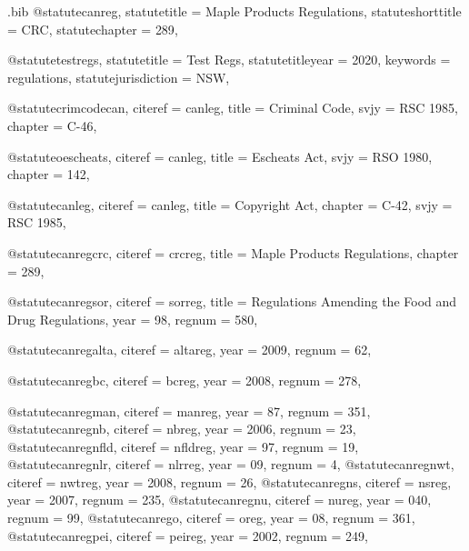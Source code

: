 \begin{filecontents*}{\jobname.bib}
@statute{canreg,
statutetitle = {Maple Products Regulations},
statuteshorttitle = {CRC},
statutechapter = {289},
}

@statute{testregs,
statutetitle = {Test Regs},
statutetitleyear = {2020},%
keywords = {regulations},
statutejurisdiction = {NSW},
}




@statute{crimcodecan,
citeref = {canleg},
title = {Criminal Code},
svjy = {RSC 1985},
chapter = {C-46},
}


@statute{oescheats,
citeref = {canleg},
title = {Escheats Act},
svjy = {RSO 1980},
chapter = {142},
}

@statute{canleg,
citeref = {canleg},
title = {Copyright Act},
chapter = {C-42},
svjy = {RSC 1985},
}

@statute{canregcrc,
citeref = {crcreg},
title = {Maple Products Regulations},
chapter = {289},
}


@statute{canregsor,
citeref = {sorreg},
title = {Regulations Amending the Food and Drug Regulations},
year = {98},
regnum = {580},
}

@statute{canregalta,
citeref = {altareg},
year = {2009},
regnum = {62},
}

@statute{canregbc,
citeref = {bcreg},
year = {2008},
regnum = {278},
}

@statute{canregman,
citeref = {manreg},
year = {87},
regnum = {351},
}
@statute{canregnb,
citeref = {nbreg},
year = {2006},
regnum = {23},
}
@statute{canregnfld,
citeref = {nfldreg},
year = {97},
regnum = {19},
}
@statute{canregnlr,
citeref = {nlrreg},
year = {09},
regnum = {4},
}
@statute{canregnwt,
citeref = {nwtreg},
year = {2008},
regnum = {26},
}
@statute{canregns,
citeref = {nsreg},
year = {2007},
regnum = {235},
}
@statute{canregnu,
citeref = {nureg},
year = {040},
regnum = {99},
}
@statute{canrego,
citeref = {oreg},
year = {08},
regnum = {361},
}
@statute{canregpei,
citeref = {peireg},
year = {2002},
regnum = {249},
}


\end{filecontents*}
